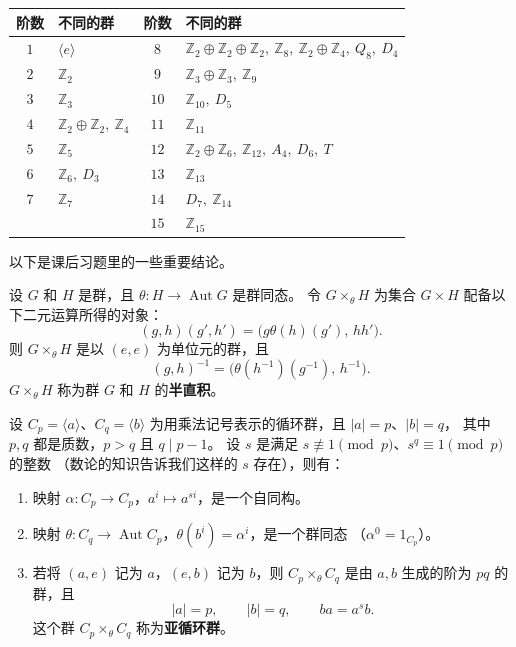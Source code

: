 {\centering
\begin{tabular}{c l@{\qquad}c l}
  \hline
  阶数 & 不同的群 & 阶数 & 不同的群 \\
  \hline
  $1$ & $\langle e\rangle$ &
  $8$ & $\mathbb Z_2\oplus\mathbb Z_2\oplus\mathbb Z_2,\ \mathbb Z_8,\ \mathbb Z_2\oplus\mathbb Z_4,\ Q_8,\ D_4$ \\
  $2$ & $\mathbb Z_2$ & $9$ & $\mathbb Z_3\oplus\mathbb Z_3,\ \mathbb Z_9$ \\
  $3$ & $\mathbb Z_3$ & $10$ & $\mathbb Z_{10},\ D_5$ \\
  $4$ & $\mathbb Z_2\oplus\mathbb Z_2,\ \mathbb Z_4$ & $11$ & $\mathbb Z_{11}$ \\
  $5$ & $\mathbb Z_5$ & $12$ & $\mathbb Z_2\oplus\mathbb Z_6,\ \mathbb Z_{12},\ A_4,\ D_6,\ T$ \\
  $6$ & $\mathbb Z_6,\ D_3$ & $13$ & $\mathbb Z_{13}$ \\
  $7$ & $\mathbb Z_7$ & $14$ & $D_7,\ \mathbb Z_{14}$ \\
      &               & $15$ & $\mathbb Z_{15}$ \\
  \hline
\end{tabular}\par}

以下是课后习题里的一些重要结论。

\begin{definition}[半直积]\label{def:semidirect-product}
设 $G$ 和 $H$ 是群，且 $\theta:H\to\operatorname{Aut}G$ 是群同态。
令 $G\times_\theta H$ 为集合 $G\times H$ 配备以下二元运算所得的对象：
\[
  (g,h)(g',h')=\bigl(g\theta(h)(g'),\,hh'\bigr).
\]
则 $G\times_\theta H$ 是以 $(e,e)$ 为单位元的群，且
\[
  (g,h)^{-1}=\bigl(\theta(h^{-1})(g^{-1}),\,h^{-1}\bigr).
\]
$G\times_\theta H$ 称为群 $G$ 和 $H$ 的\textbf{半直积}。
\end{definition}

\begin{proposition}[亚循环群]\label{prop:metacyclic-group-of-order-pq}
设 $C_p=\langle a\rangle$、$C_q=\langle b\rangle$ 为用乘法记号表示的循环群，且 $|a|=p$、$|b|=q$，
其中 $p,q$ 都是质数，$p>q$ 且 $q\mid p-1$。
设 $s$ 是满足 $s\not\equiv1\pmod p$、$s^q\equiv1\pmod p$ 的整数
\textcolor{notepurple}{（数论的知识告诉我们这样的 $s$ 存在）}，则有：
\begin{enumerate}[label=(\arabic*)]
  \item 映射 $\alpha:C_p\to C_p$，$a^i\mapsto a^{si}$，是一个自同构。
  \item 映射 $\theta:C_q\to\operatorname{Aut}C_p$，$\theta(b^i)=\alpha^i$，是一个群同态
    （$\alpha^{0}=1_{C_p}$）。
  \item 若将 $(a,e)$ 记为 $a$，$(e,b)$ 记为 $b$，则 $C_p\times_\theta C_q$ 是由 $a,b$ 生成的阶为 $pq$ 的群，且
    \[
      |a|=p,\qquad |b|=q,\qquad ba=a^sb.
    \]
    这个群 $C_p\times_\theta C_q$ 称为\textbf{亚循环群}。
\end{enumerate}
\end{proposition}

